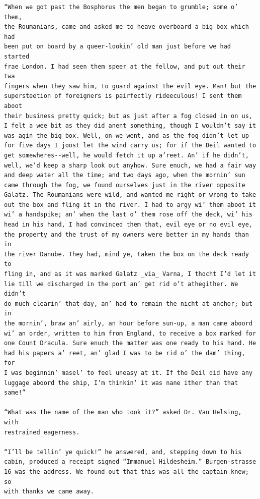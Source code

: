 \documentclass{article}
\begin{document}
\begin{verbatim}
“When we got past the Bosphorus the men began to grumble; some o’ them,
the Roumanians, came and asked me to heave overboard a big box which had
been put on board by a queer-lookin’ old man just before we had started
frae London. I had seen them speer at the fellow, and put out their twa
fingers when they saw him, to guard against the evil eye. Man! but the
supersteetion of foreigners is pairfectly rideeculous! I sent them aboot
their business pretty quick; but as just after a fog closed in on us,
I felt a wee bit as they did anent something, though I wouldn’t say it
was agin the big box. Well, on we went, and as the fog didn’t let up
for five days I joost let the wind carry us; for if the Deil wanted to
get somewheres--well, he would fetch it up a’reet. An’ if he didn’t,
well, we’d keep a sharp look out anyhow. Sure enuch, we had a fair way
and deep water all the time; and two days ago, when the mornin’ sun
came through the fog, we found ourselves just in the river opposite
Galatz. The Roumanians were wild, and wanted me right or wrong to take
out the box and fling it in the river. I had to argy wi’ them aboot it
wi’ a handspike; an’ when the last o’ them rose off the deck, wi’ his
head in his hand, I had convinced them that, evil eye or no evil eye,
the property and the trust of my owners were better in my hands than in
the river Danube. They had, mind ye, taken the box on the deck ready to
fling in, and as it was marked Galatz _via_ Varna, I thocht I’d let it
lie till we discharged in the port an’ get rid o’t athegither. We didn’t
do much clearin’ that day, an’ had to remain the nicht at anchor; but in
the mornin’, braw an’ airly, an hour before sun-up, a man came aboord
wi’ an order, written to him from England, to receive a box marked for
one Count Dracula. Sure enuch the matter was one ready to his hand. He
had his papers a’ reet, an’ glad I was to be rid o’ the dam’ thing, for
I was beginnin’ masel’ to feel uneasy at it. If the Deil did have any
luggage aboord the ship, I’m thinkin’ it was nane ither than that same!”

“What was the name of the man who took it?” asked Dr. Van Helsing, with
restrained eagerness.

“I’ll be tellin’ ye quick!” he answered, and, stepping down to his
cabin, produced a receipt signed “Immanuel Hildesheim.” Burgen-strasse
16 was the address. We found out that this was all the captain knew; so
with thanks we came away.


\end{verbatim}
\end{document}
